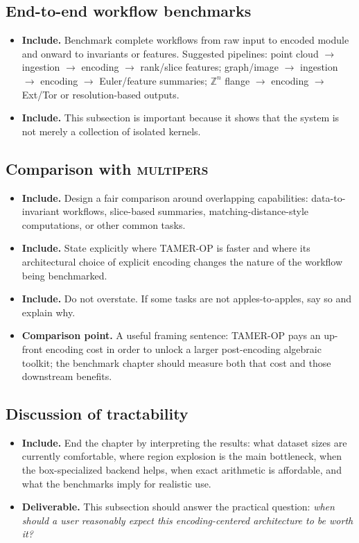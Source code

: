 \documentclass[11pt]{article}
\newcommand{\TAMER}{\textsc{TAMER-OP}}
\newcommand{\multipers}{\textsc{multipers}}
\newenvironment{plan}{\begin{itemize}[leftmargin=1.6em,itemsep=0.35em,topsep=0.25em]}{\end{itemize}}
\newcommand{\includeitems}[1]{\item \textbf{Include.} #1}
\newcommand{\deliverable}[1]{\item \textbf{Deliverable.} #1}
\newcommand{\compare}[1]{\item \textbf{Comparison point.} #1}
\begin{document}
\subsection{End-to-end workflow benchmarks}

\begin{plan}
    \includeitems{Benchmark complete workflows from raw input to encoded module and onward to invariants or features. Suggested pipelines: point cloud $\to$ ingestion $\to$ encoding $\to$ rank/slice features; graph/image $\to$ ingestion $\to$ encoding $\to$ Euler/feature summaries; $\mathbb{Z}^n$ flange $\to$ encoding $\to$ Ext/Tor or resolution-based outputs.}
    \includeitems{This subsection is important because it shows that the system is not merely a collection of isolated kernels.}
\end{plan}

\subsection{Comparison with \multipers{}}

\begin{plan}
    \includeitems{Design a fair comparison around overlapping capabilities: data-to-invariant workflows, slice-based summaries, matching-distance-style computations, or other common tasks.}
    \includeitems{State explicitly where \TAMER{} is faster and where its architectural choice of explicit encoding changes the nature of the workflow being benchmarked.}
    \includeitems{Do not overstate. If some tasks are not apples-to-apples, say so and explain why.}
    \compare{A useful framing sentence: \TAMER{} pays an up-front encoding cost in order to unlock a larger post-encoding algebraic toolkit; the benchmark chapter should measure both that cost and those downstream benefits.}
\end{plan}

\subsection{Discussion of tractability}

\begin{plan}
    \includeitems{End the chapter by interpreting the results: what dataset sizes are currently comfortable, where region explosion is the main bottleneck, when the box-specialized backend helps, when exact arithmetic is affordable, and what the benchmarks imply for realistic use.}
    \deliverable{This subsection should answer the practical question: \emph{when should a user reasonably expect this encoding-centered architecture to be worth it?}}
\end{plan}
\end{document}
